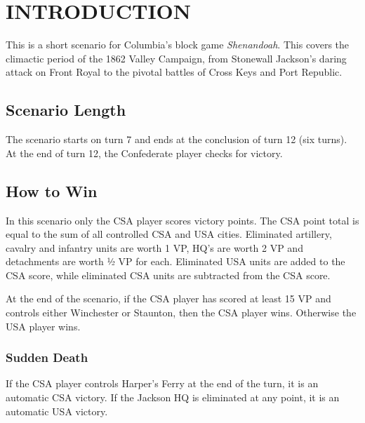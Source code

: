 \section{INTRODUCTION}

This is a short scenario for Columbia’s block game \textit{Shenandoah}. This covers the climactic period of the 1862 Valley Campaign, from Stonewall Jackson’s daring attack on Front Royal to the pivotal battles of Cross Keys and Port Republic.

\subsection{Scenario Length}

The scenario starts on turn 7 and ends at the conclusion of turn 12 (six turns). At the end of turn 12, the Confederate player checks for victory.

\subsection{How to Win}

In this scenario only the CSA player scores victory points. The CSA point total is equal to the sum of all controlled CSA and USA cities. Eliminated artillery, cavalry and infantry units are worth 1 VP, HQ’s are worth 2 VP and detachments are worth ½ VP for each. Eliminated USA units are added to the CSA score, while eliminated CSA units are subtracted from the CSA score.

At the end of the scenario, if the CSA player has scored at least 15 VP and controls either Winchester or Staunton, then the CSA player wins. Otherwise the USA player wins.

\subsubsection{Sudden Death}

If the CSA player controls Harper’s Ferry at the end of the turn, it is an automatic CSA victory. If the Jackson HQ is eliminated at any point, it is an automatic USA victory.
